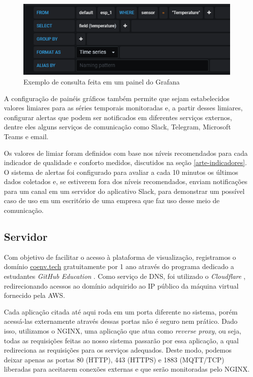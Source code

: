 \documentclass[../monografia.tex]{subfiles}
\begin{document}
\begin{figure}[h!]
	\centering
	\includegraphics[scale=0.7]{grafana-graph-query.png}
	\caption{Exemplo de consulta feita em um painel do Grafana}
	\label{fig:grafana-query}
\end{figure}


A configuração de painéis gráficos também permite que sejam estabelecidos valores limiares para as séries temporais monitoradas e, a partir desses limiares, configurar alertas que podem ser notificados em diferentes serviços externos, dentre eles alguns serviços de comunicação como Slack, Telegram, Microsoft Teams e email. 

Os valores de limiar foram definidos com base nos níveis recomendados para cada indicador de qualidade e conforto medidos, discutidos na seção \ref{arte-indicadores}. O sistema de alertas foi configurado para avaliar a cada 10 minutos os últimos dados coletados e, se estiverem fora dos níveis recomendados, enviam notificações para um canal em um servidor do aplicativo Slack, para demonstrar um possível caso de uso em um escritório de uma empresa que faz uso desse meio de comunicação.



\subsection{Servidor}

Com objetivo de facilitar o acesso à plataforma de visualização, registramos o domínio \underline{coenv.tech} gratuitamente por 1 ano através do programa dedicado a estudantes \textit{GitHub Education} \cite{github-education}. Como serviço de DNS, foi utilizado o \textit{Cloudflare} \cite{cloudflare}, redirecionando acessos ao domínio adquirido ao IP público da máquina virtual fornecido pela AWS.

Cada aplicação citada até aqui roda em um porta diferente no sistema, porém acessá-las externamente através dessas portas não é seguro nem prático. Dado isso, utilizamos o NGINX, uma aplicação que atua como \textit{reverse proxy}, ou seja, todas as requisições feitas ao nosso sistema passarão por essa aplicação, a qual redireciona as requisições para os serviços adequados. Deste modo, podemos deixar apenas as portas 80 (HTTP), 443 (HTTPS) e 1883 (MQTT/TCP) liberadas para aceitarem conexões externas e que serão monitoradas pelo NGINX.
\end{document}
